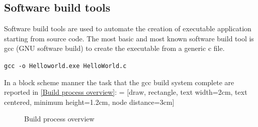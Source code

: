 \documentclass[../main.tex]{subfiles}
\begin{document}
\subsection{Software build tools}
Software build tools are used to automate the creation of executable application starting from source code. The most basic and most known software build tool is gcc (GNU software build) to create the executable from a generic c file. 
\begin{center}
    \texttt{gcc -o Helloworld.exe HelloWorld.c}
\end{center}
In a block scheme manner the task that the gcc build system complete are reported in \ref{Build process overview}:
 = [draw, rectangle, text width=2cm, text centered, minimum height=1.2cm, node distance=3cm]
\begin{figure}[h]
  \centering
{}
  \caption{Build process overview}
\end{figure}
\end{document}
